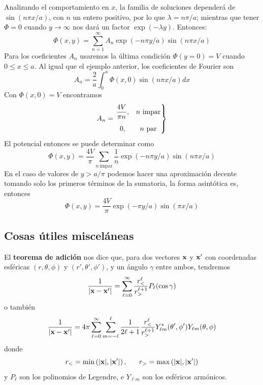 \documentclass[]{article}
\numberwithin{equation}{section}
\begin{document}
Analizando el comportamiento en \(x\), la familia de soluciones dependerá de \(\sin(n\pi x/a)\), con \(n\) un entero positivo, por lo que \(\lambda=n\pi/a\); mientras que tener \(\Phi=0\) cuando \(y\rightarrow\infty\) nos dará un factor \(\exp(-\lambda y)\). Entonces:
\begin{equation}
	\Phi(x,y) = \sum_{n=1}^{\infty}A_n \exp(-n\pi y/a) \sin(n\pi x/a)
\end{equation}
Para los coeficientes \(A_n\) usaremos la última condición \(\Phi(y=0) = V\) cuando \(0\leq x\leq a\). Al igual que el ejemplo anterior, los coeficientes de Fourier son
\begin{equation}
	A_n = \frac{2}{a}\int_{0}^{a}\Phi(x,0) \sin(n\pi x/a) dx
\end{equation}
Con \(\Phi(x,0) = V\) encontramos
\begin{equation}
	A_n =
	\left. \begin{matrix}
		\dfrac{4 V}{\pi n}, &n~\mathrm{impar}\vspace{3mm}\\
		0, 					&n~\mathrm{par}
	\end{matrix}\right\rbrace 
\end{equation}
El potencial entonces se puede determinar como
\begin{equation}
	\Phi(x,y) = \frac{4 V}{\pi}\sum_{n~\mathrm{impar}}\frac{1}{n} \exp(-n\pi y/a) \sin(n\pi x/a)
\end{equation}
En el caso de valores de \(y > a/\pi\) podemos hacer una aproximación decente tomando solo los primeros términos de la sumatoria, la forma asintótica es, entonces
\begin{equation}
	\Phi(x,y) = \frac{4 V}{\pi} \exp(-\pi y/a) \sin(\pi x/a)
\end{equation}

\subsection{Cosas útiles misceláneas}
El \textbf{teorema de adición} nos dice que, para dos vectores \(\mathbf{x}\) y \(\mathbf{x}'\) con coordenadas esféricas \((r,\theta,\phi)\) y \((r',\theta',\phi')\), y un ángulo \(\gamma\) entre ambos, tendremos
\begin{equation}
	\frac{1}{|\mathbf{x} - \mathbf{x}'|} = \sum_{\ell=0}^{\infty} \frac{r_{<}^{\ell}}{r_{>}^{\ell + 1}} P_{\ell}(\cos\gamma)
\end{equation}
o también
\begin{equation}
	\frac{1}{|\mathbf{x} - \mathbf{x}'|} = 4\pi \sum_{\ell=0}^{\infty} \sum_{m=-\ell}^{\ell} \frac{1}{2\ell + 1} \frac{r_{<}^{\ell}}{r_{>}^{\ell + 1}} Y^{*}_{\ell m}(\theta', \phi') Y_{\ell m}(\theta, \phi) \label{add_theorem}
\end{equation}
donde
\begin{equation*}
	r_{<} = \min\left(|\mathbf{x}|, |\mathbf{x}'|\right), ~~~~~ r_{>} = \max\left(|\mathbf{x}|, |\mathbf{x}'|\right)
\end{equation*}
y \(P_{\ell}\) son los polinomios de Legendre, e \(Y_{\ell m}\) son los esféricos armónicos.
\end{document}
